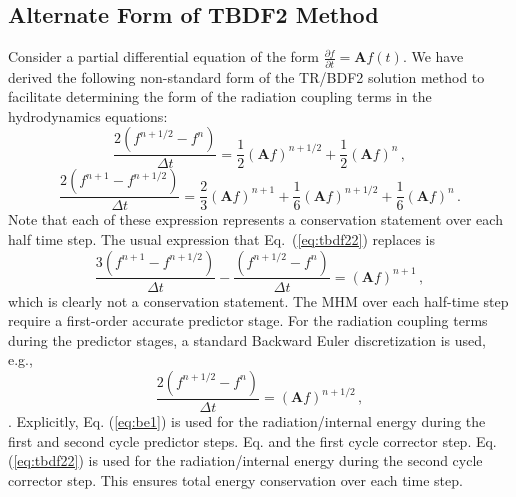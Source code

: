 \documentclass[preprint,12pt]{elsarticle}
\newcommand{\fn}[1]{\left( #1 \right)}
\newcommand{\dxdy}[2]{\frac{\partial #1}{\partial #2}}
\newcommand{\be}{\begin{equation}}
\newcommand{\ee}{\end{equation}}
\newcommand{\pec}{\, ,}
\newcommand{\pep}{\, .}
\newcommand{\lequ}[1]{\label{eq:#1}}
\newcommand{\equ}[1]{Eq.~(\ref{eq:#1})}
\newcommand{\requ}[1]{(\ref{eq:#1})}
\newcommand{\half}{\frac{1}{2}}
\newcommand{\mA}{\mathbf{A}}
\begin{document}
\subsection{Alternate Form of TBDF2 Method}
\label{sec:Alternate}
Consider a partial differential equation of the form $\dxdy{f}{t} = \mA f(t)$.  We have derived the following non-standard form of the TR/BDF2
solution method to facilitate determining the form 
of the radiation coupling terms in the hydrodynamics equations:
\be
\frac{2\fn{f^{n+1/2}-f^{n}}}{\Delta t} = \half (\mA f)^{n+1/2} + \half (\mA f)^{n} \pec
\lequ{tbdf21}
\ee
\be
\frac{2\fn{f^{n+1}-f^{n+1/2}}}{\Delta t} = 
\frac{2}{3} (\mA f)^{n+1} + \frac{1}{6} (\mA f)^{n+1/2} + \frac{1}{6} (\mA f)^{n} \pep
\lequ{tbdf22}
\ee
Note that each of these expression represents a conservation statement over each half time step.  
The usual expression that \equ{tbdf22} replaces is
\be
\frac{3\fn{f^{n+1}-f^{n+1/2}}}{\Delta t} - \frac{\fn{f^{n+1/2}-f^{n}}}{\Delta t}   = 
(\mA f)^{n+1} \pec
\lequ{tbdf23}
\ee
which is clearly not a conservation statement. The MHM over each half-time step require a first-order accurate predictor stage. For the radiation coupling terms during
the predictor stages, a standard Backward Euler discretization is used, e.g.,
\be
\frac{2\fn{f^{n+1/2}-f^{n}}}{\Delta t} = (\mA f)^{n+1/2} \pec
\lequ{be1}
\ee.
Explicitly, Eq. \requ{be1} is used for the radiation/internal energy during the first and second 
cycle predictor steps.  Eq. and the first cycle corrector step.  Eq. \requ{tbdf22} is used for the radiation/internal energy during the 
second cycle corrector step.  This ensures total energy conservation over each time step.
\end{document}
